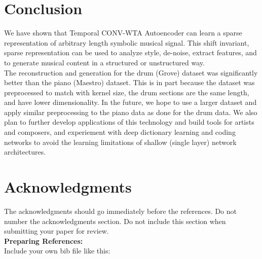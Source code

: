 \documentclass[11pt,a4paper]{article}
\begin{document}
\section{Conclusion}

%
%


We have shown that Temporal CONV-WTA Autoencoder can learn a sparse representation of arbitrary length symbolic musical signal. This shift invariant, sparse representation can be used to analyze style, de-noise, extract features, and to generate musical content in a structured or unstructured way. \\
The reconstruction and generation for the drum (Grove) dataset was significantly better than the piano (Maestro) dataset. This is in part because the dataset was preprocessed to match with kernel size, the drum sections are the same length, and have lower dimensionality. 
In the future, we hope to use a larger dataset and apply similar preprocessing to the piano data as done for the drum data. We also plan to further develop applications of this technology and build tools for artists and composers, and experiement with deep dictionary learning and coding networks \cite{tang2020dictionary} to avoid the learning limitations of shallow (single layer) network architectures.

\section*{Acknowledgments}

The acknowledgments should go immediately before the references.  Do
not number the acknowledgments section. Do not include this section
when submitting your paper for review. \\

\noindent \textbf{Preparing References:} \\
Include your own bib file like this:
\verb||
\verb|| 
\end{document}
